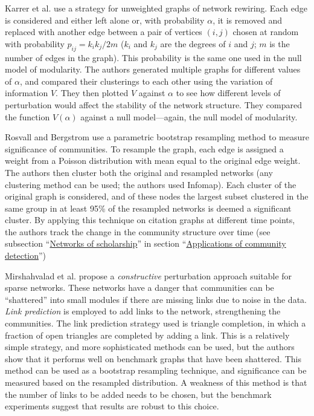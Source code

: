 Karrer et al. \autocite{karrer_robustness_2008} use a strategy for
unweighted graphs of network rewiring. Each edge is considered and
either left alone or, with probability \(\alpha\), it is removed and
replaced with another edge between a pair of vertices \((i, j)\) chosen
at random with probability \(p_{ij} = k_i k_j / 2m\) (\(k_i\) and
\(k_j\) are the degrees of \(i\) and \(j\); \(m\) is the number of edges
in the graph). This probability is the same one used in the null model
of modularity. The authors generated multiple graphs for different
values of \(\alpha\), and compared their clusterings to each other using
the variation of information \(V\). They then plotted \(V\) against
\(\alpha\) to see how different levels of perturbation would affect the
stability of the network structure. They compared the function
\(V(\alpha)\) against a null model---again, the null model of
modularity.

Rosvall and Bergstrom use a parametric bootstrap resampling method to
measure significance of communities. To resample the graph, each edge is
assigned a weight from a Poisson distribution with mean equal to the
original edge weight. The authors then cluster both the original and
resampled networks (any clustering method can be used; the authors used
Infomap). Each cluster of the original graph is considered, and of these
nodes the largest subset clustered in the same group in at least 95\% of
the resampled networks is deemed a significant cluster. By applying this
technique on citation graphs at different time points, the authors track
the change in the community structure over time (see subsection
``\protect\hyperlink{networks-of-scholarship}{Networks of scholarship}''
in section ``\protect\hyperlink{applications}{Applications of community
detection}'')

Mirshahvalad et al. \autocite{mirshahvalad_significant_2012} propose a
\emph{constructive} perturbation approach suitable for sparse networks.
These networks have a danger that communities can be ``shattered'' into
small modules if there are missing links due to noise in the data.
\emph{Link prediction} is employed to add links to the network,
strengthening the communities. The link prediction strategy used is
triangle completion, in which a fraction of open triangles are completed
by adding a link. This is a relatively simple strategy, and more
sophisticated methods can be used, but the authors show that it performs
well on benchmark graphs that have been shattered. This method can be
used as a bootstrap resampling technique, and significance can be
measured based on the resampled distribution. A weakness of this method
is that the number of links to be added needs to be chosen, but the
benchmark experiments suggest that results are robust to this choice.

